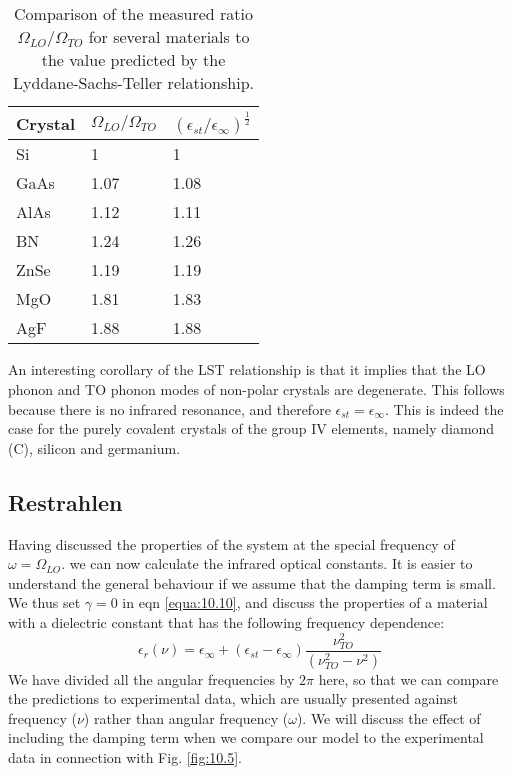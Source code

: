 \documentclass[12pt]{book}
\begin{document}
{\begin{table}
  \centering
  \caption{Comparison of the measured ratio $\Omega_{LO}/\Omega_{TO}$ for several materials to the value predicted by the Lyddane-Sachs-Teller relationship.}\label{tab:10.2}
  \begin{tabular}{lll}
    \hline
    Crystal & $\Omega_{LO}/\Omega_{TO}$ & $(\epsilon_{st}/\epsilon_{\infty})^{\frac{1}{2}}$ \\ \hline
    Si & 1 & 1 \\
    GaAs & 1.07 & 1.08 \\
    AlAs & 1.12 & 1.11 \\
    BN & 1.24 & 1.26 \\
    ZnSe & 1.19 & 1.19 \\
    MgO & 1.81 & 1.83 \\
    AgF & 1.88 & 1.88 \\
    \hline
  \end{tabular}
\end{table}

An interesting corollary of the LST relationship is that it implies that the LO phonon and TO phonon modes of non-polar crystals are degenerate. This follows because there is no infrared resonance, and therefore $\epsilon_{st}=\epsilon_{\infty}$. This is indeed the case for the purely covalent crystals of the group IV elements, namely diamond (C), silicon and germanium.

\subsection{Restrahlen}

Having discussed the properties of the system at the special frequency of $\omega=\Omega_{LO}$. we can now calculate the infrared optical constants. It is easier to understand the general behaviour if we assume that the damping term is small. We thus set $\gamma=0$ in eqn \ref{equa:10.10}, and discuss the properties of a material with a dielectric constant that has the following frequency dependence:
\begin{equation}\label{equa:10.16}
  \epsilon_r(\nu)=\epsilon_{\infty}+(\epsilon_{st}-\epsilon_{\infty})\frac{\nu_{TO}^2}{(\nu_{TO}^2-\nu^2)}
\end{equation}
We have divided all the angular frequencies by $2\pi$ here, so that we can compare the predictions to experimental data, which are usually presented against frequency ($\nu$) rather than angular frequency ($\omega$). We will discuss the effect of including the damping term when we compare our model to the experimental data in connection with Fig. \ref{fig:10.5}.

}
\end{document}
